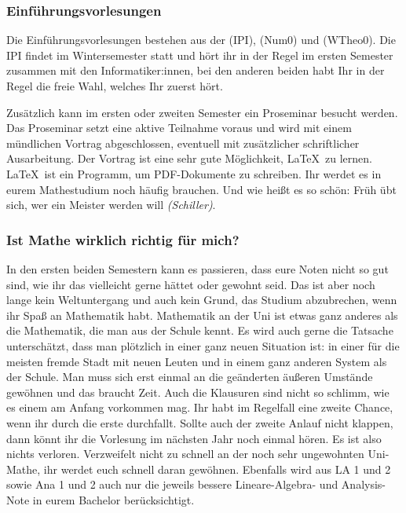 \subsubsection{Einführungsvorlesungen}

Die Einführungsvorlesungen bestehen aus der  (\gls{IPI}),  (\gls{Num0}) und  (\gls{WTheo0}). Die \gls{IPI} findet im Wintersemester statt und hört ihr in der Regel im ersten Semester zusammen mit den Informatiker:innen, bei den anderen beiden habt Ihr in der Regel die freie Wahl, welches Ihr zuerst hört.

Zusätzlich kann im ersten oder zweiten Semester ein Proseminar besucht werden. Das Proseminar setzt eine aktive Teilnahme voraus und wird mit einem mündlichen Vortrag abgeschlossen, eventuell mit zusätzlicher schriftlicher Ausarbeitung. Der Vortrag ist eine sehr gute Möglichkeit, \LaTeX\ zu lernen. \LaTeX\ ist ein Programm, um PDF-Dokumente zu schreiben. Ihr werdet es in eurem Mathestudium noch häufig brauchen. Und wie heißt es so schön: Früh übt sich, wer ein Meister werden will \textit{(Schiller)}.

\subsubsection{Ist Mathe wirklich richtig für mich?}

In den ersten beiden Semestern kann es passieren, dass eure Noten nicht so gut sind, wie ihr das vielleicht gerne hättet oder gewohnt seid. Das ist aber noch lange kein Weltuntergang und auch kein Grund, das Studium abzubrechen, wenn ihr Spaß an Mathematik habt. Mathematik an der Uni ist etwas ganz anderes als die Mathematik, die man aus der Schule kennt. Es wird auch gerne die Tatsache unterschätzt, dass man plötzlich in einer ganz neuen Situation ist: in einer für die meisten fremde Stadt mit neuen Leuten und in einem ganz anderen System als der Schule. Man muss sich erst einmal an die geänderten äußeren Umstände gewöhnen und das braucht Zeit. Auch die Klausuren sind nicht so schlimm, wie es einem am Anfang vorkommen mag. Ihr habt im Regelfall eine zweite Chance, wenn ihr durch die erste durchfallt. Sollte auch der zweite Anlauf nicht klappen, dann könnt ihr die Vorlesung im nächsten Jahr noch einmal hören. Es ist also nichts verloren. Verzweifelt nicht zu schnell an der noch sehr ungewohnten Uni-Mathe, ihr werdet euch schnell daran gewöhnen. Ebenfalls wird aus \gls{LA} 1 und 2 sowie \gls{Ana} 1 und 2 auch nur die jeweils bessere Lineare-Algebra- und Analysis-Note in eurem Bachelor berücksichtigt.

